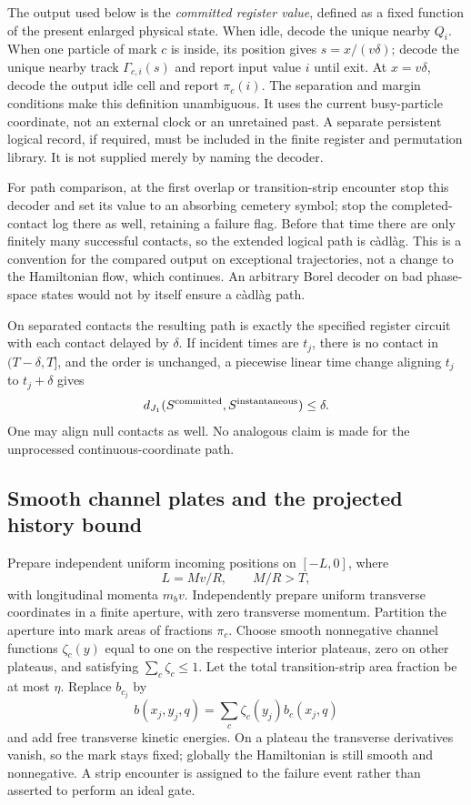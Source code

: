 \documentclass[11pt]{article}
\theoremstyle{definition}\newtheorem{definition}[theorem]{Definition}
\theoremstyle{remark}\newtheorem{remark}[theorem]{Remark}
\begin{document}
The output used below is the \emph{committed register value}, defined as a
fixed function of the present enlarged physical state. When idle, decode the
unique nearby $Q_i$. When one particle of mark $c$ is inside, its position
gives $s=x/(v\delta)$; decode the unique nearby track $\Gamma_{c,i}(s)$ and
report input value $i$ until exit. At $x=v\delta$, decode the output idle
cell and report $\pi_c(i)$. The separation and margin conditions make this
definition unambiguous. It uses the current busy-particle coordinate, not an
external clock or an unretained past. A separate persistent logical record,
if required, must be included in the finite register and permutation library.
It is not supplied merely by naming the decoder.

For path comparison, at the first overlap or transition-strip encounter
stop this decoder and set its value to an absorbing cemetery symbol;
stop the completed-contact log there as well, retaining a failure flag.
Before that time there are only finitely many successful contacts, so
the extended logical path is c\`adl\`ag. This is a convention for the
compared output on exceptional trajectories, not a change to the
Hamiltonian flow, which continues. An arbitrary Borel decoder on bad
phase-space states would not by itself ensure a c\`adl\`ag path.

On separated contacts the resulting path is exactly the specified register
circuit with each contact delayed by $\delta$. If incident times are $t_j$,
there is no contact in $(T-\delta,T]$, and the order is unchanged, a
piecewise linear time change aligning $t_j$ to $t_j+\delta$ gives
\begin{equation}\label{mech:J1}
 d_{J_1}(S^{\rm committed},S^{\rm instantaneous})\le\delta.
\end{equation}
One may align null contacts as well. No analogous claim is made for the
unprocessed continuous-coordinate path.

\subsection{Smooth channel plates and the projected history bound}

Prepare independent uniform incoming positions on $[-L,0]$, where
\[
 L=Mv/R,\qquad M/R>T,
\]
with longitudinal momenta $m_bv$. Independently prepare uniform transverse
coordinates in a finite aperture, with zero transverse momentum.
Partition the aperture into mark areas of fractions $\pi_c$.
Choose smooth nonnegative channel functions $\zeta_c(y)$ equal to one on
the respective interior plateaus, zero on other plateaus, and satisfying
$\sum_c\zeta_c\le1$. Let the total transition-strip area fraction be at most
$\eta$. Replace $b_{c_j}$ by
\[
 b(x_j,y_j,q)=\sum_c\zeta_c(y_j)b_c(x_j,q)
\]
and add free transverse kinetic energies. On a plateau the transverse
derivatives vanish, so the mark stays fixed; globally the Hamiltonian is
still smooth and nonnegative. A strip encounter is assigned to the failure
event rather than asserted to perform an ideal gate.
\end{document}
